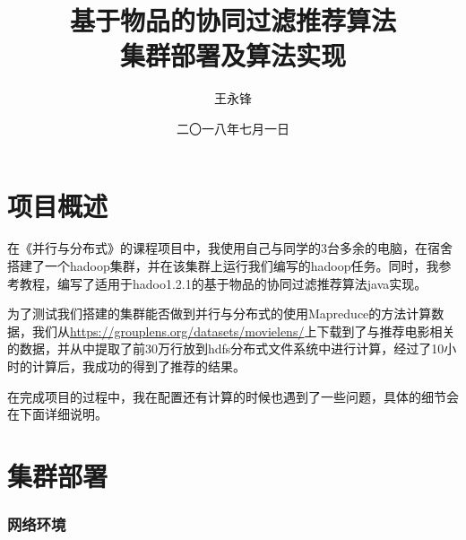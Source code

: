 \documentclass[forprint]{myreport}
\begin{document}
\title{ 基于物品的协同过滤推荐算法 \\ 集群部署及算法实现}
\author{王永锋}                            %
\date{二〇一八年七月一日}                %
\maketitle
\frontmatter
\tableofcontents
\mainmatter 

\chapter{项目概述}

在《并行与分布式》的课程项目中，我使用自己与同学的3台多余的电脑，在宿舍搭建了一个hadoop集群，并在该集群上运行我们编写的hadoop任务。同时，我参考教程，编写了适用于hadoo1.2.1的基于物品的协同过滤推荐算法java实现。

为了测试我们搭建的集群能否做到并行与分布式的使用Mapreduce的方法计算数据，我们从\url{https://grouplens.org/datasets/movielens/}上下载到了与推荐电影相关的数据，并从中提取了前30万行放到hdfs分布式文件系统中进行计算，经过了10小时的计算后，我成功的得到了推荐的结果。

在完成项目的过程中，我在配置还有计算的时候也遇到了一些问题，具体的细节会在下面详细说明。

\chapter{集群部署}

\subsection{网络环境}
\end{document}
